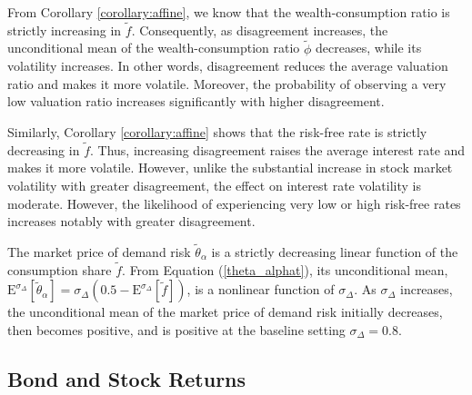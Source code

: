 \documentclass[preprint,11pt,authoryear]{elsarticle}
\theoremstyle{plain}
\begin{document}
From Corollary \ref{corollary:affine}, we know that the wealth-consumption ratio is strictly increasing in \( \tilde{f} \). Consequently, as disagreement increases, the unconditional mean of the wealth-consumption ratio \( \tilde{\phi} \) decreases, while its volatility increases. In other words, disagreement reduces the average valuation ratio and makes it more volatile. Moreover, the probability of observing a very low valuation ratio increases significantly with higher disagreement.

Similarly, Corollary \ref{corollary:affine} shows that the risk-free rate is strictly decreasing in \( \tilde{f} \). Thus, increasing disagreement raises the average interest rate and makes it more volatile. However, unlike the substantial increase in stock market volatility with greater disagreement, the effect on interest rate volatility is moderate. However, the likelihood of experiencing very low or high risk-free rates increases notably with greater disagreement.

The market price of demand risk \( \tilde{\theta}_{\alpha} \) is a strictly decreasing linear function of the consumption share \( \tilde{f} \). From Equation (\ref{theta_alphat}), its unconditional mean, $\mathrm{E}^{\sigma_{\Delta}} \left[ \tilde{\theta}_{\alpha} \right] = \sigma_{\Delta}\left( 0.5 - \mathrm{E}^{\sigma_{\Delta}} \left[ \tilde{f} \right] \right)$, is a nonlinear function of \( \sigma_{\Delta}\).
As \( \sigma_{\Delta}\) increases, the unconditional mean of the market price of demand risk initially decreases, then becomes positive, and is positive at the baseline setting \( \sigma_{\Delta}= 0.8 \).



 


\subsection{Bond and Stock Returns} \label{sec:StockBondDynamics}
\end{document}
